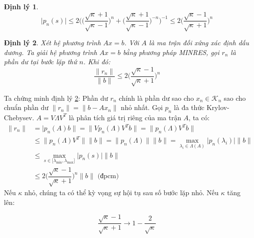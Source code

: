 \documentclass[14pt, a4paper]{article}
\numberwithin{equation}{section}
\numberwithin{algorithm}{section}
\numberwithin{figure}{section}
\newtheorem{dl}{Định lý}
\numberwithin{dl}{section}
\numberwithin{md}{section}
\numberwithin{bd}{section}
\numberwithin{dn}{section}
\numberwithin{hq}{section}
\begin{document}
\begin{enumerate}[a)]
\begin{dl}
        \begin{equation}
            \lvert p_n(s) \rvert \leq 2 \Bigg( \Big(\dfrac{\sqrt{\kappa} + 1}{\sqrt{\kappa}-1}\Big)^n + \Big(\dfrac{\sqrt{\kappa} + 1}{\sqrt{\kappa}-1}\Big)^{-n}\Bigg)^{-1} \leq 2 \Big ( \dfrac{\sqrt{\kappa} - 1}{\sqrt{\kappa} + 1} \Big)^n
        \end{equation}
    \end{dl}

    \begin{dl} \label{dl:MINRES-RESIDUAL-CHEBYSEV}
        Xét hệ phương trình $Ax=b$. Với $A$ là ma trận đối xứng xác định dấu dương. Ta giải hệ phương trình $Ax=b$ bằng phương pháp MINRES, gọi $r_n$ là phần dư tại bước lặp thứ $n$. Khi đó:
        \begin{equation} \label{eq:MINRES-A-SPD-UPPER-BOUND}
            \dfrac{\lVert r_n \rVert }{\lVert b \rVert} \leq 2\Big(\dfrac{\sqrt{\kappa} - 1}{\sqrt{\kappa} + 1}\Big)^n
        \end{equation}
    \end{dl}
    Ta chứng minh định lý \ref{dl:MINRES-RESIDUAL-CHEBYSEV}: Phần dư $r_n$ chính là phần dư sao cho $x_n \in \mathcal{K}_n$ sao cho chuẩn phần dư $\lVert r_n \rVert = \lVert b - Ax_n \rVert$ nhỏ nhất. Gọi $p_n$ là đa thức Krylov-Chebysev. $A=V \Lambda V^T$ là phân tích giá trị riêng của ma trận $A$, ta có:
    \begin{equation}
        \begin{aligned}
        \lVert r_n \rVert &= \lvert p_n(A)b \rVert=\lVert V p_n(\Lambda) V^T b \rVert = \lVert p_n(\Lambda) V^T b \rVert \\
        & \leq \lVert p_n(\Lambda) V^T \rVert \lVert b \rVert = \lVert p_n(\Lambda) \rVert \lVert b \rVert = \max_{\lambda_i \in \Lambda(A)} \lvert p_n(\lambda_i) \rvert \lVert b \rVert \\
        & \leq \max_{s \in \lbrack \lambda_{\min}, \lambda_{\max} \rbrack} \lvert p_n(s) \rvert \lVert b \rVert \\
        & \leq 2 \Big( \dfrac{\sqrt{\kappa}-1}{\sqrt{\kappa} + 1}\Big)^n \lVert b \rVert \text{ (đpcm) } 
        \end{aligned}
    \end{equation}
    Nếu $\kappa$ nhỏ, chúng ta có thể kỳ vọng sự hội tụ sau số bước lặp nhỏ. Nếu $\kappa$ tăng lên:

    \begin{equation}
        \dfrac{\sqrt{\kappa}-1}{\sqrt{\kappa} + 1} \rightarrow 1 - \dfrac{2}{\sqrt{\kappa}}
    \end{equation}


\end{enumerate}
\end{document}

